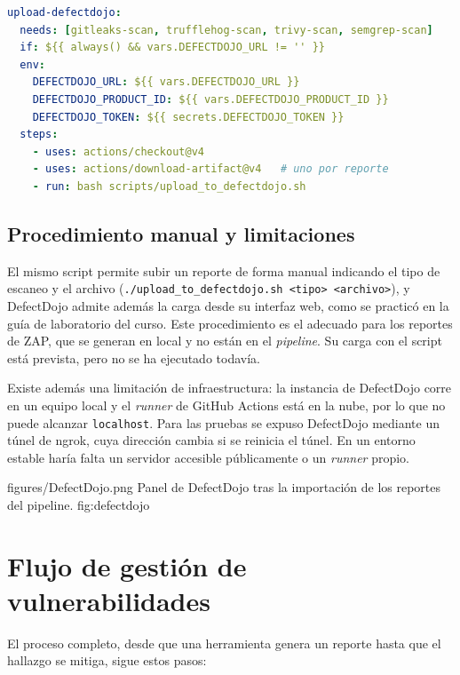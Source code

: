 \begin{lstlisting}[language=yaml, caption={Job que sube los hallazgos a DefectDojo.}, label={lst:dojo-job}]
upload-defectdojo:
  needs: [gitleaks-scan, trufflehog-scan, trivy-scan, semgrep-scan]
  if: ${{ always() && vars.DEFECTDOJO_URL != '' }}
  env:
    DEFECTDOJO_URL: ${{ vars.DEFECTDOJO_URL }}
    DEFECTDOJO_PRODUCT_ID: ${{ vars.DEFECTDOJO_PRODUCT_ID }}
    DEFECTDOJO_TOKEN: ${{ secrets.DEFECTDOJO_TOKEN }}
  steps:
    - uses: actions/checkout@v4
    - uses: actions/download-artifact@v4   # uno por reporte
    - run: bash scripts/upload_to_defectdojo.sh
\end{lstlisting}

\subsection{Procedimiento manual y limitaciones}

El mismo script permite subir un reporte de forma manual indicando el tipo de
escaneo y el archivo (\texttt{./upload\_to\_defectdojo.sh <tipo>
<archivo>}), y DefectDojo admite además la carga desde su interfaz web, como
se practicó en la guía de laboratorio del curso. Este procedimiento es el
adecuado para los reportes de ZAP, que se generan en local y no están en el
\textit{pipeline}. Su carga con el script está prevista, pero no se ha
ejecutado todavía.

Existe además una limitación de infraestructura: la instancia de DefectDojo
corre en un equipo local y el \textit{runner} de GitHub Actions está en la
nube, por lo que no puede alcanzar \texttt{localhost}. Para las pruebas se
expuso DefectDojo mediante un túnel de ngrok, cuya dirección cambia si se
reinicia el túnel. En un entorno estable haría falta un servidor accesible
públicamente o un \textit{runner} propio.

\evidencefigure
{figures/DefectDojo.png}
{Panel de DefectDojo tras la importación de los reportes del pipeline.}
{fig:defectdojo}

\section{Flujo de gestión de vulnerabilidades}

El proceso completo, desde que una herramienta genera un reporte hasta que el
hallazgo se mitiga, sigue estos pasos:

